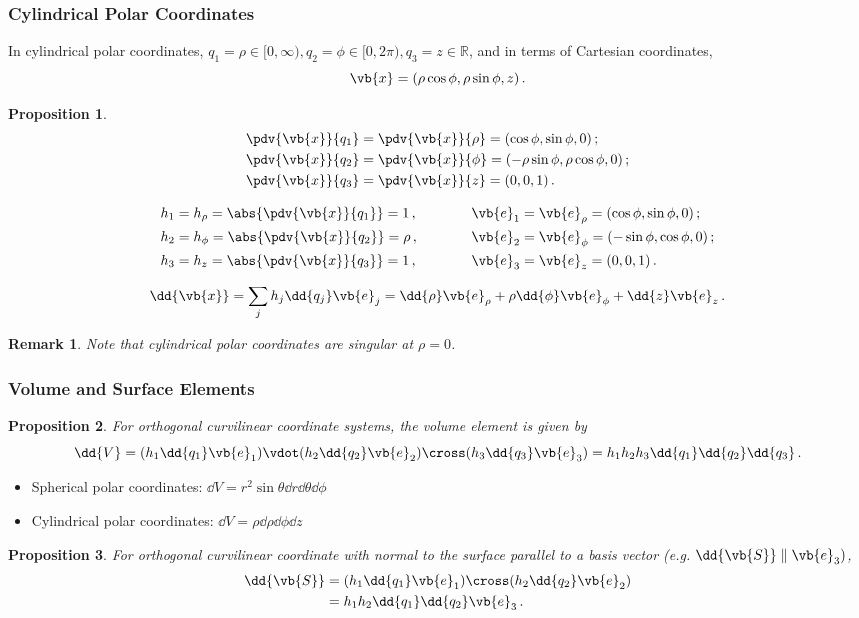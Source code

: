 \documentclass{article}
\theoremstyle{plain}\theoremheaderfont{\normalfont\itshape}\theorembodyfont{\rmfamily}\theoremseparator{.}\newtheorem*{rem}{Remark}\newtheorem*{ex}{Example}\newtheorem*{proof}{Proof}\newtheorem*{altp}{Alternative proof}
\theoremstyle{plain}\theoremheaderfont{\normalfont\bfseries}\theorembodyfont{\rmfamily}\theoremseparator{.}\newtheorem{thm}{Theorem}[section]\newtheorem{lem}[thm]{Lemma}\newtheorem{prop}[thm]{Proposition}\newtheorem*{cor}{Corollary}\newtheorem{defn}[thm]{Definition}\newtheorem{clm}[thm]{Claim}\newtheorem{clminproof}{Claim}
\theoremstyle{break}\theoremheaderfont{\normalfont\itshape}\theorembodyfont{\rmfamily}\theoremseparator{.\medskip}\newtheorem*{proofskip}{Proof}\newtheorem*{exs}{Examples}\newtheorem*{rems}{Remarks}
\theoremstyle{break}\theoremheaderfont{\normalfont\bfseries}\theorembodyfont{\rmfamily}\theoremseparator{.\medskip}\newtheorem{lemskip}[thm]{Lemma}\newtheorem{defnskip}[thm]{Definition}\newtheorem{propskip}[thm]{Proposition}\newtheorem{thmskip}[thm]{Theorem}
\numberwithin{equation}{section}
\begin{document}
	\subsubsection{Cylindrical Polar Coordinates}
	In cylindrical polar coordinates, \(q_1=\rho\in[0,\infty), q_2=\phi\in[0,2\pi), q_3=z\in\mathbb{R}\), and in terms of Cartesian coordinates,
	\[\vb{x}=(\rho\cos\phi,\rho\sin\phi,z)\,.\]
	\begin{prop}
		\begin{align*}
			&\pdv{\vb{x}}{q_1}=\pdv{\vb{x}}{\rho}=(\cos\phi,\sin\phi,0)\,;\\
			&\pdv{\vb{x}}{q_2}=\pdv{\vb{x}}{\phi}=(-\rho\sin\phi,\rho\cos\phi,0)\,;\\
			&\pdv{\vb{x}}{q_3}=\pdv{\vb{x}}{z}=(0,0,1)\,.
		\end{align*}
		
		\begin{align*}
			&h_1=h_\rho=\abs{\pdv{\vb{x}}{q_1}}=1\,,\qquad\quad &\vb{e}_1&=\vb{e}_\rho=(\cos\phi,\sin\phi,0)\,;\\
			&h_2=h_\phi=\abs{\pdv{\vb{x}}{q_2}}=\rho\,, &\vb{e}_2&=\vb{e}_\phi=(-\sin\phi,\cos\phi,0)\,;\\
			&h_3=h_z=\abs{\pdv{\vb{x}}{q_3}}=1\,, &\vb{e}_3&=\vb{e}_z=(0,0,1)\,.
		\end{align*}
		
		\[\dd{\vb{x}}=\sum_j h_j\dd{q_j}\vb{e}_j=\dd{\rho}\vb{e}_\rho+\rho\dd{\phi}\vb{e}_\phi+\dd{z}\vb{e}_z\,.\]
	\end{prop}
	\begin{rem}
		Note that cylindrical polar coordinates are singular at \(\rho=0\).
	\end{rem}
	
	\subsubsection{Volume and Surface Elements}
	\begin{prop}
		For orthogonal curvilinear coordinate systems, the volume element is given by
		\[\dd{V}=(h_1\dd{q_1}\vb{e}_1)\vdot(h_2\dd{q_2}\vb{e}_2)\cross(h_3\dd{q_3}\vb{e}_3)=h_1h_2h_3\dd{q_1}\dd{q_2}\dd{q_3}\,.\]
	\end{prop}
	\begin{itemize}
		\item Spherical polar coordinates: \(\dd{V}=r^2\sin\theta\dd{r}\dd{\theta}\dd{\phi}\)
		\item Cylindrical polar coordinates: \(\dd{V}=\rho\dd{\rho}\dd{\phi}\dd{z}\)
	\end{itemize}
	\begin{prop}
		For orthogonal curvilinear coordinate with normal to the surface parallel to a basis vector (e.g. \(\dd{\vb{S}}\parallel\vb{e}_3)\),
		\begin{align*}
			\dd{\vb{S}}&=(h_1\dd{q_1}\vb{e}_1)\cross(h_2\dd{q_2}\vb{e}_2)\\
			&=h_1h_2\dd{q_1}\dd{q_2}\vb{e}_3\,.
		\end{align*}
	\end{prop}
	
\end{document}
